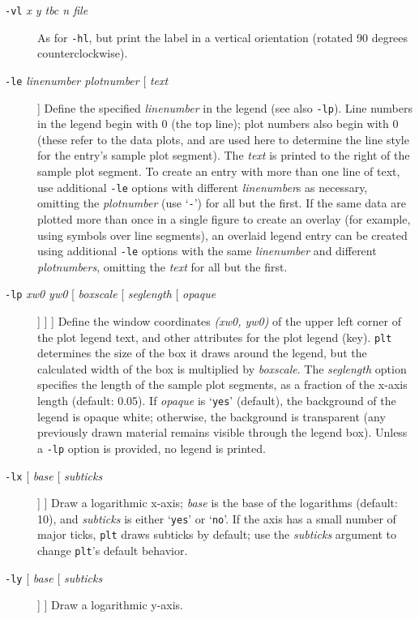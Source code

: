 \begin{description}
\item [\texttt{-vl}\textit{ x y tbc n file} ] As for \texttt{-hl}, but print the label in a vertical orientation
(rotated 90 degrees counterclockwise). 
\item [\texttt{-le}\textit{ linenumber plotnumber} [ \textit{text} ]
] Define the specified \textit{linenumber} in the legend (see also \texttt{-lp}). Line numbers
in the legend begin with 0 (the top line);  plot numbers also begin with
0 (these refer to the data plots, and are used here to determine the line
style for the entry's sample plot segment).  The \textit{text} is printed to the right
of the sample plot segment.  To create an entry with more than one line
of text, use additional \texttt{-le} options with different \textit{linenumber}s as necessary,
omitting the \textit{plotnumber} (use `\texttt{-}') for all but the first.  If the same data
are plotted more than once in a single figure to create an overlay (for
example, using symbols over line segments), an overlaid legend entry can
be created using additional \texttt{-le} options with the same \textit{linenumber} and different
\textit{plotnumbers}, omitting the \textit{text} for all but the first. 
\item [\texttt{-lp}\textit{ xw0 yw0} [ \textit{boxscale}
[ \textit{seglength} [ \textit{opaque} ] ] ] ] Define the window coordinates \textit{(xw0, yw0)} of
the upper left corner of the plot legend text, and other attributes for
the plot legend (key). \texttt{plt} determines the size of the box it draws around
the legend, but the calculated width of the box is multiplied by \textit{boxscale}.
 The \textit{seglength} option specifies the length of the sample plot segments,
as a fraction of the x-axis length (default: 0.05).  If \textit{opaque} is `\texttt{yes}' (default),
the background of the legend is opaque white; otherwise, the background
is transparent (any previously drawn material remains visible through the
legend box).  Unless a \texttt{-lp} option is provided, no legend is printed. 
\item [\texttt{-lx} [
\textit{base} [ \textit{subticks} ] ] ] Draw a logarithmic x-axis;  \textit{base} is the base of the
logarithms (default: 10), and \textit{subticks} is either `\texttt{yes}' or `\texttt{no}'.  If the axis
has a small number of major ticks, \texttt{plt} draws subticks by default; use the
\textit{subticks} argument to change \texttt{plt}'s default behavior. 
\item [\texttt{-ly} [ \textit{base} [ \textit{subticks}
] ] ] Draw a logarithmic y-axis. 

\end{description}
